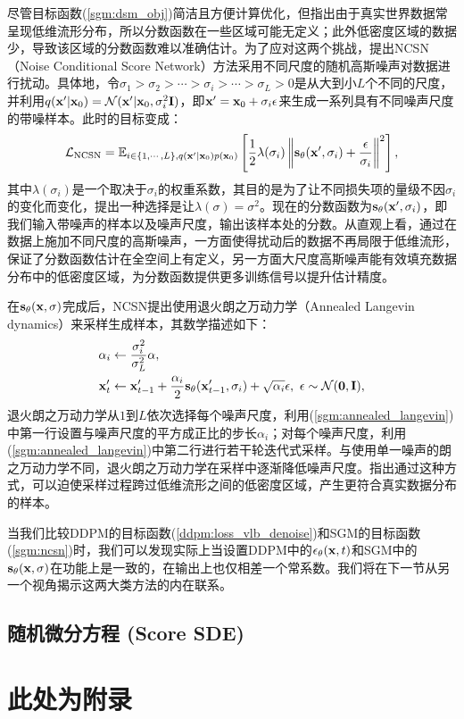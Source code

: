 \documentclass[11pt,a4paper,UTF8]{ctexart}
\begin{document}
尽管目标函数(\ref{sgm:dsm_obj})简洁且方便计算优化，但\cite{song2019generative}指出由于真实世界数据常呈现低维流形分布，所以分数函数在一些区域可能无定义；此外低密度区域的数据少，导致该区域的分数函数难以准确估计。为了应对这两个挑战，\cite{song2019generative}提出NCSN（Noise Conditional Score Network）方法采用不同尺度的随机高斯噪声对数据进行扰动。具体地，令$\sigma_1 > \sigma_2 > \cdots > \sigma_i > \cdots > \sigma_L > 0$是从大到小$L$个不同的尺度，并利用$q(\mathbf{x}^\prime|\mathbf{x}_0)=\mathcal{N}(\mathbf{x}^\prime|\mathbf{x}_0,\sigma_i^2\mathbf{I})$，即$\mathbf{x}^\prime=\mathbf{x}_0+\sigma_i\epsilon$来生成一系列具有不同噪声尺度的带噪样本。此时的目标变成：
\begin{align}
\begin{split}
    \mathcal{L}_{\text{NCSN}}=\mathbb{E}_{i\in\{1,\cdots,L\},q(\mathbf{x}^\prime|\mathbf{x}_0)p(\mathbf{x}_0)} \left[\frac{1}{2} \lambda(\sigma_i)\left\| \mathbf{s}_\theta(\mathbf{x}^\prime,\sigma_i) + \frac{\epsilon}{\sigma_i} \right\|^2 \right],
\end{split}
\label{sgm:ncsn}
\end{align}
其中$\lambda(\sigma_i)$是一个取决于$\sigma_i$的权重系数，其目的是为了让不同损失项的量级不因$\sigma_i$的变化而变化，\cite{song2019generative}提出一种选择是让$\lambda(\sigma)=\sigma^2$。现在的分数函数为$\mathbf{s}_\theta(\mathbf{x}^\prime,\sigma_i)$，即我们输入带噪声的样本以及噪声尺度，输出该样本处的分数。从直观上看，通过在数据上施加不同尺度的高斯噪声，一方面使得扰动后的数据不再局限于低维流形，保证了分数函数估计在全空间上有定义，另一方面大尺度高斯噪声能有效填充数据分布中的低密度区域，为分数函数提供更多训练信号以提升估计精度。

在$\mathbf{s}_\theta(\mathbf{x},\sigma)$完成后，NCSN提出使用退火朗之万动力学（Annealed Langevin dynamics）来采样生成样本，其数学描述如下：
\begin{align}
\begin{split}
\alpha_i &\leftarrow \frac{\sigma_i^2}{\sigma_L^2}\alpha, \\
\mathbf{x}^\prime_t & \leftarrow\mathbf{x}^\prime_{t-1} + \frac{\alpha_i}{2}\mathbf{s}_{\theta}(\mathbf{x}^\prime_{t-1},\sigma_i) + \sqrt{\alpha_i}\epsilon,\ \epsilon\sim\mathcal{N}(\mathbf{0},\mathbf{I}),
\end{split}
\label{sgm:annealed_langevin}
\end{align}
退火朗之万动力学从$1$到$L$依次选择每个噪声尺度，利用(\ref{sgm:annealed_langevin})中第一行设置与噪声尺度的平方成正比的步长$\alpha_i$；对每个噪声尺度，利用(\ref{sgm:annealed_langevin})中第二行进行若干轮迭代式采样。与使用单一噪声的朗之万动力学不同，退火朗之万动力学在采样中逐渐降低噪声尺度。\cite{song2019generative}指出通过这种方式，可以迫使采样过程跨过低维流形之间的低密度区域，产生更符合真实数据分布的样本。

当我们比较DDPM的目标函数(\ref{ddpm:loss_vlb_denoise})和SGM的目标函数(\ref{sgm:ncsn})时，我们可以发现实际上当设置DDPM中的$\epsilon_{\theta}(\mathbf{x},t)$和SGM中的$\mathbf{s}_\theta(\mathbf{x},\sigma)$在功能上是一致的，在输出上也仅相差一个常系数。我们将在下一节从另一个视角揭示这两大类方法的内在联系。


\subsection{随机微分方程 (Score SDE)}


\newpage


\newpage
\appendix


\section{此处为附录}
\end{document}
